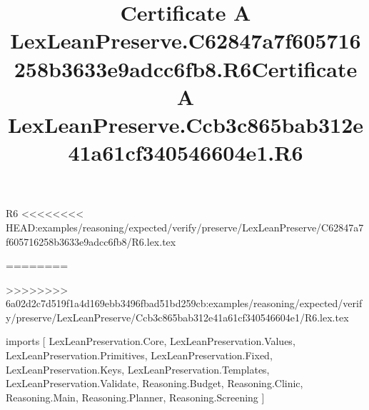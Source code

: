\begin{lexlean}{R6}
<<<<<<<< HEAD:examples/reasoning/expected/verify/preserve/LexLeanPreserve/C62847a7f605716258b3633e9adcc6fb8/R6.lex.tex
\title{Certificate A LexLeanPreserve.C62847a7f605716258b3633e9adcc6fb8.R6}
========
\title{Certificate A LexLeanPreserve.Ccb3c865bab312e41a61cf340546604e1.R6}
>>>>>>>> 6a02d2c7d519f1a4d169ebb3496fbad51bd259cb:examples/reasoning/expected/verify/preserve/LexLeanPreserve/Ccb3c865bab312e41a61cf340546604e1/R6.lex.tex
\begin{coremodule}
imports [
  LexLeanPreservation.Core,
  LexLeanPreservation.Values,
  LexLeanPreservation.Primitives,
  LexLeanPreservation.Fixed,
  LexLeanPreservation.Keys,
  LexLeanPreservation.Templates,
  LexLeanPreservation.Validate,
  Reasoning.Budget,
  Reasoning.Clinic,
  Reasoning.Main,
  Reasoning.Planner,
  Reasoning.Screening
]


\end{coremodule}
\end{lexlean}
